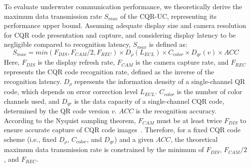 \documentclass[preprint,12pt]{elsarticle}
\begin{document}
To evaluate underwater communication performance, we theoretically derive the maximum data transmission rate $S_{max}$ of the CQR-UC, representing its performance upper bound. Assuming adequate display size and camera resolution for CQR code presentation and capture, and considering display latency to be negligible compared to recognition latency, $S_{max}$ is defined as:
\begin{equation}
    S_{max}=min(F_{DIS}, F_{CAM}/2, F_{REC})\times D_\rho(L_{ECL}) \times C_{color} \times D_{qr} (v)\times ACC
    \label{eq10}
\end{equation}
Here, $F_{DIS}$ is the display refresh rate, $F_{CAM}$ is the camera capture rate, and $F_{REC}$ represents the CQR code recognition rate, defined as the inverse of the recognition latency.
$D_\rho$ represents the information density of a single-channel QR code, which depends on error correction level $L_{ECL}$. $C_{color}$ is the number of color channels used, and $D_{qr}$ is the data capacity of a single-channel CQR code, determined by the QR code version $v$. $ACC$ is the recognition accuracy. 
According to the Nyquist sampling theorem,  $F_{CAM}$ must be at least twice $F_{DIS}$ to ensure accurate capture of CQR code images~\cite{JIANG2016colorful}. Therefore, for a fixed CQR code scheme (i.e., fixed $D_\rho$, $C_{color}$, and $D_{qr}$) and a given $ACC$, the theoretical maximum data transmission rate is constrained by the minimum of $F_{DIS}$, $F_{CAM}/2$, and $F_{REC}$.
\end{document}
